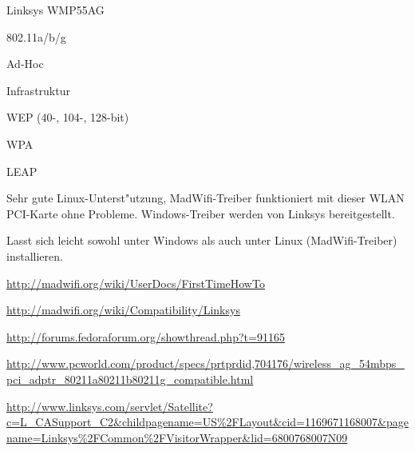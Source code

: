 %
%
\begin{wlandevice}{Linksys WMP55AG}



\begin{wlanieeestandard}
\item 802.11a/b/g
\end{wlanieeestandard}

\begin{wlanmode}
\item Ad-Hoc
\item Infrastruktur
\end{wlanmode}

\begin{wlansecurity}
\item WEP (40-, 104-, 128-bit)
\item WPA
\item LEAP
\end{wlansecurity}

\begin{wlandriver}
\item
Sehr gute Linux-Unterst"utzung, MadWifi-Treiber funktioniert
mit dieser WLAN PCI-Karte ohne Probleme.
Windows-Treiber werden von Linksys bereitgestellt.
\end{wlandriver}


\begin{wlaninstall}
\item
Lasst sich leicht sowohl unter Windows als auch unter Linux (MadWifi-Treiber)
installieren.

\url{http://madwifi.org/wiki/UserDocs/FirstTimeHowTo}
\end{wlaninstall}

\begin{wlanlink}
\item \url{http://madwifi.org/wiki/Compatibility/Linksys}
\item \url{http://forums.fedoraforum.org/showthread.php?t=91165}
\item \url{http://www.pcworld.com/product/specs/prtprdid,704176/wireless_ag_54mbps_pci_adptr_80211a80211b80211g_compatible.html}
\item \url{http://www.linksys.com/servlet/Satellite?c=L_CASupport_C2&childpagename=US\%2FLayout&cid=1169671168007&pagename=Linksys\%2FCommon\%2FVisitorWrapper&lid=6800768007N09}
\end{wlanlink}

\end{wlandevice}

